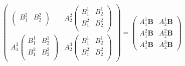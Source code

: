 \begin{equation}
\begin{pmatrix}
\begin{pmatrix}
      B^2_1 & B^2_2 \\
    \end{pmatrix}
    &
    A^2_2
    \begin{pmatrix}
      B^1_1 & B^1_2 \\
      B^2_1 & B^2_2 \\
    \end{pmatrix}
    \\
    A^3_1
    \begin{pmatrix}
      B^1_1 & B^1_2 \\
      B^2_1 & B^2_2 \\
    \end{pmatrix}
    &
    A^3_2
    \begin{pmatrix}
      B^1_1 & B^1_2 \\
      B^2_1 & B^2_2 \\
    \end{pmatrix}
  \end{pmatrix}
  =
  \begin{pmatrix}
    A^1_1\mathbf{B} & A^1_2\mathbf{B} \\
    A^2_1\mathbf{B} & A^2_2\mathbf{B} \\
    A^3_1\mathbf{B} & A^3_2\mathbf{B}
  \end{pmatrix}
\end{equation}

